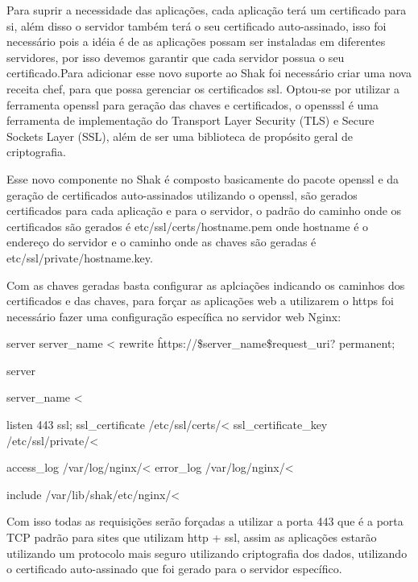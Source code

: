 Para suprir a necessidade das aplicações, cada aplicação terá um certificado para
si, além disso o servidor também terá o seu certificado auto-assinado, isso foi necessário
pois a idéia é de as aplicações possam ser instaladas em diferentes servidores, por
isso devemos garantir que cada servidor possua o seu certificado.Para adicionar
esse novo suporte ao Shak foi necessário criar uma nova receita chef,
para que possa gerenciar os certificados ssl. Optou-se por utilizar a ferramenta
openssl para geração das chaves e certificados, o opensssl é uma ferramenta de
implementação do Transport Layer Security (TLS) e Secure Sockets Layer (SSL),
além de ser uma biblioteca de propósito geral de criptografia\cite{openssl}.

Esse novo componente no Shak é composto basicamente do pacote openssl e da geração
de certificados auto-assinados utilizando o openssl, são gerados certificados
para cada aplicação e para o servidor, o padrão do caminho onde os certificados são
gerados é etc/ssl/certs/hostname.pem onde hostname é o endereço do servidor
e o caminho onde as chaves são geradas é etc/ssl/private/hostname.key.

Com as chaves geradas basta configurar as aplciações indicando os caminhos dos certificados
e das chaves, para forçar as aplicações web a utilizarem o https foi necessário fazer
uma configuração específica no servidor web Nginx:

\begin{center}
server {
    server\_name <%
    rewrite     \^   https://\$server\_name\$request\_uri? permanent;
}

server {
    server\_name <%

    listen 443 ssl;
    ssl\_certificate       /etc/ssl/certs/<%
    ssl\_certificate\_key   /etc/ssl/private/<%

    access\_log            /var/log/nginx/<%
    error\_log             /var/log/nginx/<%

    include /var/lib/shak/etc/nginx/<%
}

\end{center}

Com isso todas as requisições serão forçadas a utilizar a porta 443 que é a porta
TCP padrão para sites que utilizam http + ssl, assim as aplicações estarão utilizando
um protocolo mais seguro utilizando criptografia dos dados, utilizando o
certificado auto-assinado que foi gerado para o servidor específico.


